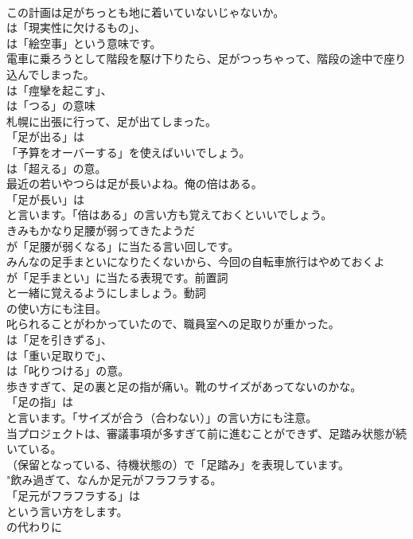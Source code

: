 \documentclass[8pt]{extreport}
\begin{document}
\begin{CJK}{UTF8}{min}
\\	この計画は足がちっとも地に着いていないじゃないか。 
\\	は「現実性に欠けるもの」、
\\	は「絵空事」という意味です。	
\\	電車に乗ろうとして階段を駆け下りたら、足がつっちゃって、階段の途中で座り込んでしまった。 
\\	は「痙攣を起こす」、
\\	は「つる」の意味	
\\	札幌に出張に行って、足が出てしまった。 
\\	「足が出る」は
\\	「予算をオーバーする」を使えばいいでしょう。
\\	は「超える」の意。	
\\	最近の若いやつらは足が長いよね。俺の倍はある。 
\\	「足が長い」は
\\	と言います。「倍はある」の言い方も覚えておくといいでしょう。	
\\	きみもかなり足腰が弱ってきたようだ 
\\	が「足腰が弱くなる」に当たる言い回しです。	
\\	みんなの足手まといになりたくないから、今回の自転車旅行はやめておくよ 
\\	が「足手まとい」に当たる表現です。前置詞 
\\	と一緒に覚えるようにしましょう。動詞 
\\	の使い方にも注目。	
\\	叱られることがわかっていたので、職員室への足取りが重かった。 
\\	は「足を引きずる」、
\\	は「重い足取りで」、
\\	は「叱りつける」の意。	
\\	歩きすぎて、足の裏と足の指が痛い。靴のサイズがあってないのかな。 
\\	「足の指」は
\\	と言います。「サイズが合う（合わない）」の言い方にも注意。	
\\	当プロジェクトは、審議事項が多すぎて前に進むことができず、足踏み状態が続いている。 
\\	（保留となっている、待機状態の）で「足踏み」を表現しています。	
\\	"飲み過ぎて、なんか足元がフラフラする。 
\\	「足元がフラフラする」は
\\	という言い方をします。
\\	の代わりに

\end{CJK}
\end{document}
